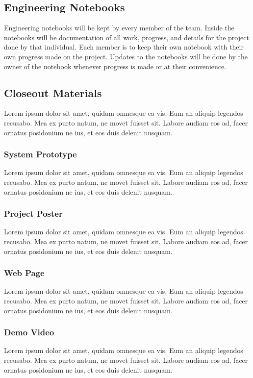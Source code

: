 \subsection{Engineering Notebooks}
Engineering notebooks will be kept by every member of the team. Inside the notebooks will be documentation of all work, progress, and details for the project done by that individual. Each member is to keep their own notebook with their own progress made on the project. Updates to the notebooks will be done by the owner of the notebook whenever progress is made or at their convenience.   

\subsection{Closeout Materials}
Lorem ipsum dolor sit amet, quidam omnesque ea vis. Eum an aliquip legendos recusabo. Mea ex purto natum, ne movet fuisset sit. Labore audiam eos ad, facer ornatus posidonium ne ius, et eos duis delenit nusquam.

\subsubsection{System Prototype}
Lorem ipsum dolor sit amet, quidam omnesque ea vis. Eum an aliquip legendos recusabo. Mea ex purto natum, ne movet fuisset sit. Labore audiam eos ad, facer ornatus posidonium ne ius, et eos duis delenit nusquam.

\subsubsection{Project Poster}
Lorem ipsum dolor sit amet, quidam omnesque ea vis. Eum an aliquip legendos recusabo. Mea ex purto natum, ne movet fuisset sit. Labore audiam eos ad, facer ornatus posidonium ne ius, et eos duis delenit nusquam.

\subsubsection{Web Page}
Lorem ipsum dolor sit amet, quidam omnesque ea vis. Eum an aliquip legendos recusabo. Mea ex purto natum, ne movet fuisset sit. Labore audiam eos ad, facer ornatus posidonium ne ius, et eos duis delenit nusquam.

\subsubsection{Demo Video}
Lorem ipsum dolor sit amet, quidam omnesque ea vis. Eum an aliquip legendos recusabo. Mea ex purto natum, ne movet fuisset sit. Labore audiam eos ad, facer ornatus posidonium ne ius, et eos duis delenit nusquam.


